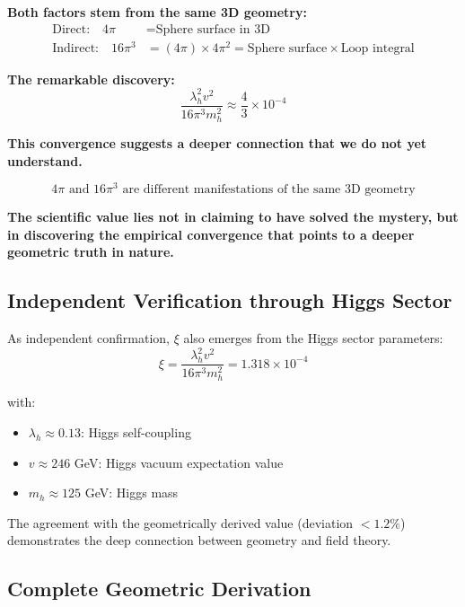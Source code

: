 \documentclass[12pt,a4paper]{article}
\begin{document}
\textbf{Both factors stem from the same 3D geometry:}
\begin{align}
	\text{Direct:} \quad 4\pi &= \text{Sphere surface in 3D} \\
	\text{Indirect:} \quad 16\pi^3 &= (4\pi) \times 4\pi^2 = \text{Sphere surface} \times \text{Loop integral}
\end{align}

\textbf{The remarkable discovery:}
\begin{equation}
	\frac{\lambda_h^2 v^2}{16\pi^3 m_h^2} \approx \frac{4}{3} \times 10^{-4}
\end{equation}

\textbf{This convergence suggests a deeper connection that we do not yet understand.}

\begin{equation}
	\boxed{4\pi \text{ and } 16\pi^3 \text{ are different manifestations of the same 3D geometry}}
\end{equation}

\textbf{The scientific value lies not in claiming to have solved the mystery, but in discovering the empirical convergence that points to a deeper geometric truth in nature.}
\subsection{Independent Verification through Higgs Sector}

As independent confirmation, $\xi$ also emerges from the Higgs sector parameters:
\begin{equation}
	\xi = \frac{\lambda_h^2 v^2}{16\pi^3 m_h^2} = 1.318 \times 10^{-4}
\end{equation}

with:
\begin{itemize}
	\item $\lambda_h \approx 0.13$: Higgs self-coupling
	\item $v \approx 246$ GeV: Higgs vacuum expectation value
	\item $m_h \approx 125$ GeV: Higgs mass
\end{itemize}

The agreement with the geometrically derived value (deviation $< 1.2\%$) demonstrates the deep connection between geometry and field theory.

\subsection{Complete Geometric Derivation}
\end{document}

